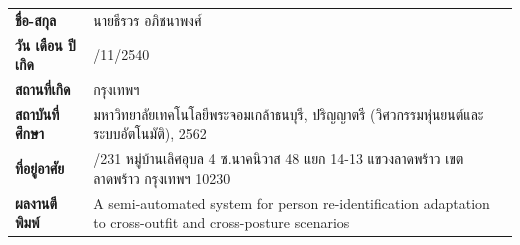 \begin{biography}

\vspace{1em}
{\renewcommand{\arraystretch}{1.0}
\begin{tabular}{@{}>{\raggedright\arraybackslash}p{} >{\raggedright\arraybackslash}p{}@{}}
\textbf{ชื่อ-สกุล}               & นายธีรวร อภิชนาพงศ์ \\
\textbf{วัน เดือน ปี เกิด}         & 20/11/2540 \\
\textbf{สถานที่เกิด}             & กรุงเทพฯ \\
\textbf{สถาบันที่ศึกษา}          & มหาวิทยาลัยเทคโนโลยีพระจอมเกล้าธนบุรี,
                                 ปริญญาตรี (วิศวกรรมหุ่นยนต์และระบบอัตโนมัติ), 2562 \\
\textbf{ที่อยู่อาศัย}            & 37/231 หมู่บ้านเลิศอุบล 4 ซ.นาคนิวาส 48 แยก 14-13 แขวงลาดพร้าว เขตลาดพร้าว กรุงเทพฯ 10230 \\
\textbf{ผลงานตีพิมพ์}           & A semi-automated system for person re-identification adaptation to cross-outfit and cross-posture scenarios
\end{tabular}}

\end{biography}
